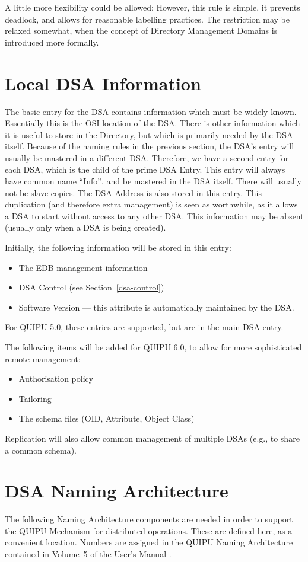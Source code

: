 A little more flexibility could be allowed;
However, this rule is simple, it prevents deadlock, and allows
for reasonable labelling practices.
The restriction may be relaxed somewhat, when the concept of Directory
Management Domains is introduced more formally.

\section {Local DSA Information}


The basic entry for the DSA contains information which must be widely known.
Essentially this is the OSI location of the DSA.  There is other information
which it is useful to store in the Directory, but which is primarily needed
by the DSA itself.  Because of the naming rules in the previous section, the
DSA's entry will usually be mastered in a different DSA.  Therefore, we have
a second entry for each DSA, which is the child of the prime DSA Entry.
This entry will always have common name ``Info'', and be mastered in the DSA
itself.  There will usually not be slave copies.  The DSA Address is also
stored in this entry.  This duplication (and therefore extra management) is
seen as worthwhile, as it allows a DSA to start without access to any other
DSA.  This information may be absent (usually only when a DSA is being
created).

Initially, the following information will be stored in this entry:

\begin {itemize}
\item The EDB management information
\item DSA Control (see Section~\ref{dsa-control})
\item Software Version --- this attribute is automatically maintained
by the DSA.
\end {itemize}

For QUIPU 5.0, these entries are supported, but are in the main DSA entry.

The following items will be added for QUIPU 6.0, to allow for more
sophisticated remote
management:

\begin {itemize}
\item Authorisation policy
\item Tailoring
\item The schema files (OID, Attribute, Object Class)
\end {itemize}

Replication will also allow common management of multiple DSAs (e.g., to share
a common schema).


\section {DSA Naming Architecture }

The following Naming Architecture components are needed in order to support
the QUIPU Mechanism for distributed operations.
These are defined here, as a convenient location.
Numbers are assigned in the QUIPU Naming Architecture contained in Volume~5
of the User's
Manual \cite{QUIPU.Manual}.


